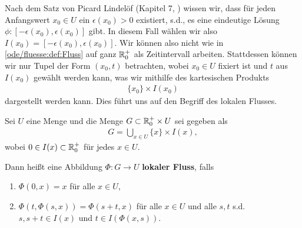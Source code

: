 Nach dem Satz von Picard Lindelöf (Kapitel 7, \cite{Ten21}) wissen wir, dass für jeden Anfangswert \(x_0\in U\) ein \(\epsilon(x_0) >0\) existiert, s.d., es eine eindeutige Lösung \(\phi: [-\epsilon(x_0), \epsilon(x_0)]\) gibt. In diesem Fall wählen wir also \(I(x_0)=[-\epsilon(x_0), \epsilon(x_0)]\). Wir können also nicht wie in \cref{ode/fluesse:def:Fluss} auf ganz \(\mathbb{R}^+_0\) als Zeitintervall arbeiten. Stattdessen können wir nur Tupel der Form \((x_0, t)\) betrachten, wobei \(x_0\in U\) fixiert ist und \(t\) aus \(I(x_0)\) gewählt werden kann, was wir mithilfe des kartesischen Produkts
\begin{align*}
\{x_0\}\times I(x_0)
\end{align*}
dargestellt werden kann. Dies führt uns auf den Begriff des lokalen Flusses.
\label{ode/fluesse:def:LokFluss}
\begin{definition}{}{}



Sei \(U\) eine Menge und die Menge \(G\subset \mathbb{R}^+_0\times U\) sei gegeben als
\begin{align*}
G = \bigcup_{x\in U} \{x\}\times I(x),
\end{align*}
wobei \(0\in I(x)\subset \mathbb{R}^+_0\) für jedes \(x\in U\).

Dann heißt eine Abbildung \(\Phi: G\rightarrow U\) \textbf{lokaler Fluss}, falls
\begin{enumerate}

\item {} 
\(\Phi(0,x) = x\) für alle \(x\in U\),

\item {} 
\(\Phi(t, \Phi(s, x)) = \Phi(s+t, x)\) für alle \(x\in U\) und alle \(s,t\) s.d. \(s, s+t\in I(x)\) und \(t\in I(\Phi(x,s))\).

\end{enumerate}
\end{definition}

